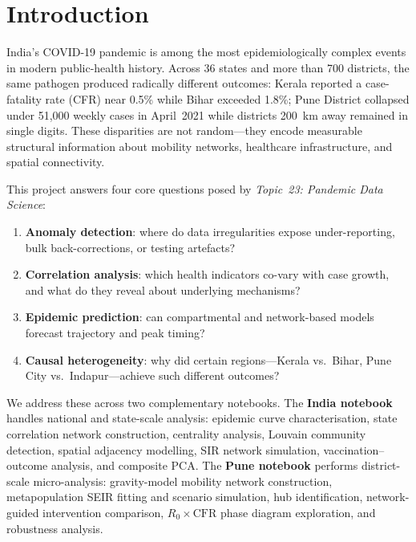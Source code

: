 \documentclass[sigconf,authordraft]{acmart}
\begin{document}
\section{Introduction}
\label{sec:intro}

India's COVID-19 pandemic is among the most epidemiologically complex events
in modern public-health history. Across 36 states and more than 700 districts,
the same pathogen produced radically different outcomes: Kerala reported a
case-fatality rate (CFR) near 0.5\% while Bihar exceeded 1.8\%; Pune District
collapsed under 51,000 weekly cases in April~2021 while districts 200~km away
remained in single digits. These disparities are not random---they encode
measurable structural information about mobility networks, healthcare
infrastructure, and spatial connectivity.

This project answers four core questions posed by \emph{Topic~23: Pandemic
Data Science}:

\begin{enumerate}
  \item \textbf{Anomaly detection}: where do data irregularities expose
    under-reporting, bulk back-corrections, or testing artefacts?
  \item \textbf{Correlation analysis}: which health indicators co-vary
    with case growth, and what do they reveal about underlying mechanisms?
  \item \textbf{Epidemic prediction}: can compartmental and network-based
    models forecast trajectory and peak timing?
  \item \textbf{Causal heterogeneity}: why did certain regions---Kerala vs.\
    Bihar, Pune City vs.\ Indapur---achieve such different outcomes?
\end{enumerate}

We address these across two complementary notebooks. The
\textbf{India notebook} handles national and state-scale analysis:
epidemic curve characterisation, state correlation network construction,
centrality analysis, Louvain community detection, spatial adjacency
modelling, SIR network simulation, vaccination--outcome analysis, and
composite PCA. The \textbf{Pune notebook} performs district-scale
micro-analysis: gravity-model mobility network construction,
metapopulation SEIR fitting and scenario simulation, hub identification,
network-guided intervention comparison, $R_0 \times \text{CFR}$ phase
diagram exploration, and robustness analysis.
\end{document}
